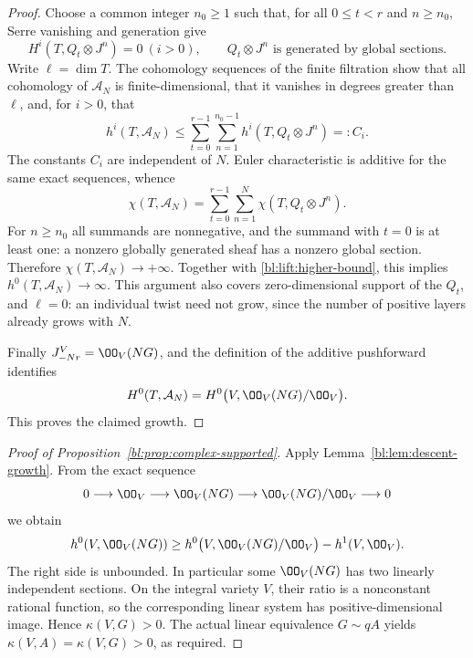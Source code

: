 \begin{proof}
Choose a common integer \(n_0\geq1\) such that, for all
\(0\leq t<r\) and \(n\geq n_0\), Serre vanishing and generation
give
\[
 H^i(T,Q_t\otimes J^n)=0\ (i>0),\qquad
 Q_t\otimes J^n\text{ is generated by global sections}.
\]
Write \(\ell=\dim T\).  The cohomology sequences of the finite
filtration show that all cohomology of \(\mathcal A_N\) is
finite-dimensional, that it vanishes in degrees greater than \(\ell\),
and, for \(i>0\), that
\begin{equation}\label{bl:lift:higher-bound}
 h^i(T,\mathcal A_N)
 \leq\sum_{t=0}^{r-1}\sum_{n=1}^{n_0-1}
             h^i(T,Q_t\otimes J^n)=:C_i.
\end{equation}
The constants \(C_i\) are independent of \(N\).  Euler
characteristic is additive for the same exact sequences, whence
\[
 \chi(T,\mathcal A_N)
   =\sum_{t=0}^{r-1}\sum_{n=1}^N\chi(T,Q_t\otimes J^n).
\]
For \(n\geq n_0\) all summands are nonnegative, and the summand
with \(t=0\) is at least one: a nonzero globally generated sheaf
has a nonzero global section.  Therefore
\(\chi(T,\mathcal A_N)\to+\infty\).  Together with
\eqref{bl:lift:higher-bound}, this implies
\(h^0(T,\mathcal A_N)\to\infty\).  This argument also covers
zero-dimensional support of the \(Q_t\), and \(\ell=0\): an
individual twist need not grow, since the number of positive layers
already grows with \(N\).

Finally \(J_{-Nr}^V=\OO_V(NG)\), and the definition of the
additive pushforward identifies
\[
 H^0(T,\mathcal A_N)
   =H^0\bigl(V,\OO_V(NG)/\OO_V\bigr).
\]
This proves the claimed growth.
\end{proof}

\begin{proof}[Proof of Proposition~\ref{bl:prop:complex-supported}]
Apply Lemma~\ref{bl:lem:descent-growth}.  From the exact sequence
\[
 0\longrightarrow\OO_V\longrightarrow\OO_V(NG)
   \longrightarrow\OO_V(NG)/\OO_V\longrightarrow0
\]
we obtain
\[
 h^0(V,\OO_V(NG))
 \geq h^0\bigl(V,\OO_V(NG)/\OO_V\bigr)-h^1(V,\OO_V).
\]
The right side is unbounded.  In particular some \(\OO_V(NG)\)
has two linearly independent sections.  On the integral variety \(V\),
their ratio is a nonconstant rational function, so the corresponding
linear system has positive-dimensional image.  Hence
\(\kappa(V,G)>0\).  The actual linear equivalence
\(G\sim qA\) yields \(\kappa(V,A)=\kappa(V,G)>0\), as required.
\end{proof}
